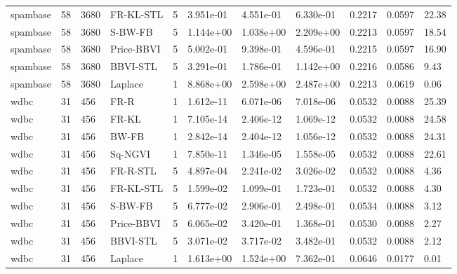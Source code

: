 \begin{tabular}{lllllllllll}
spambase & 58 & 3680 & FR-KL-STL & 5 & 3.951e-01 & 4.551e-01 & 6.330e-01 & 0.2217 & 0.0597 & 22.38 \\
spambase & 58 & 3680 & S-BW-FB & 5 & 1.144e+00 & 1.038e+00 & 2.209e+00 & 0.2213 & 0.0597 & 18.54 \\
spambase & 58 & 3680 & Price-BBVI & 5 & 5.002e-01 & 9.398e-01 & 4.596e-01 & 0.2215 & 0.0597 & 16.90 \\
spambase & 58 & 3680 & BBVI-STL & 5 & 3.291e-01 & 1.786e-01 & 1.142e+00 & 0.2216 & 0.0586 & 9.43 \\
spambase & 58 & 3680 & Laplace & 1 & 8.868e+00 & 2.598e+00 & 2.487e+00 & 0.2213 & 0.0619 & 0.06 \\
wdbc & 31 & 456 & FR-R & 1 & 1.612e-11 & 6.071e-06 & 7.018e-06 & 0.0532 & 0.0088 & 25.39 \\
wdbc & 31 & 456 & FR-KL & 1 & 7.105e-14 & 2.406e-12 & 1.069e-12 & 0.0532 & 0.0088 & 24.58 \\
wdbc & 31 & 456 & BW-FB & 1 & 2.842e-14 & 2.404e-12 & 1.056e-12 & 0.0532 & 0.0088 & 24.31 \\
wdbc & 31 & 456 & Sq-NGVI & 1 & 7.850e-11 & 1.346e-05 & 1.558e-05 & 0.0532 & 0.0088 & 22.61 \\
wdbc & 31 & 456 & FR-R-STL & 5 & 4.897e-04 & 2.241e-02 & 3.026e-02 & 0.0532 & 0.0088 & 4.36 \\
wdbc & 31 & 456 & FR-KL-STL & 5 & 1.599e-02 & 1.099e-01 & 1.723e-01 & 0.0532 & 0.0088 & 4.30 \\
wdbc & 31 & 456 & S-BW-FB & 5 & 6.777e-02 & 2.906e-01 & 2.498e-01 & 0.0534 & 0.0088 & 3.12 \\
wdbc & 31 & 456 & Price-BBVI & 5 & 6.065e-02 & 3.420e-01 & 1.368e-01 & 0.0530 & 0.0088 & 2.27 \\
wdbc & 31 & 456 & BBVI-STL & 5 & 3.071e-02 & 3.717e-02 & 3.482e-01 & 0.0532 & 0.0088 & 2.12 \\
wdbc & 31 & 456 & Laplace & 1 & 1.613e+00 & 1.524e+00 & 7.362e-01 & 0.0646 & 0.0177 & 0.01 \\
\bottomrule
\end{tabular}
